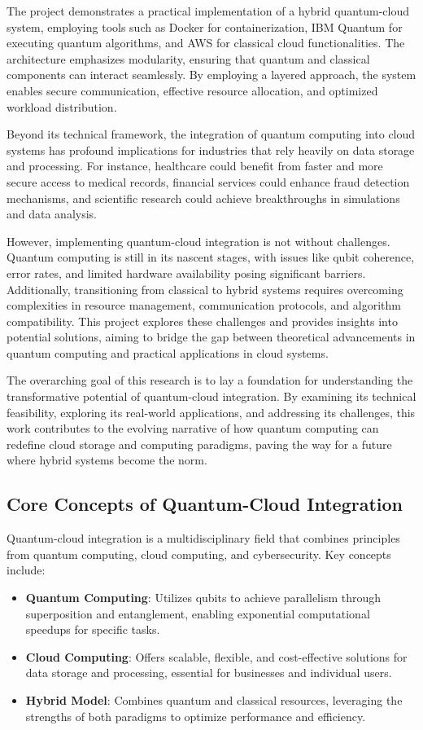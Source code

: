 \documentclass[12pt,a4paper]{article}
\begin{document}
The project demonstrates a practical implementation of a hybrid quantum-cloud system, employing tools such as Docker for containerization, IBM Quantum for executing quantum algorithms, and AWS for classical cloud functionalities. The architecture emphasizes modularity, ensuring that quantum and classical components can interact seamlessly. By employing a layered approach, the system enables secure communication, effective resource allocation, and optimized workload distribution.  

Beyond its technical framework, the integration of quantum computing into cloud systems has profound implications for industries that rely heavily on data storage and processing. For instance, healthcare could benefit from faster and more secure access to medical records, financial services could enhance fraud detection mechanisms, and scientific research could achieve breakthroughs in simulations and data analysis.  

However, implementing quantum-cloud integration is not without challenges. Quantum computing is still in its nascent stages, with issues like qubit coherence, error rates, and limited hardware availability posing significant barriers. Additionally, transitioning from classical to hybrid systems requires overcoming complexities in resource management, communication protocols, and algorithm compatibility. This project explores these challenges and provides insights into potential solutions, aiming to bridge the gap between theoretical advancements in quantum computing and practical applications in cloud systems.  

The overarching goal of this research is to lay a foundation for understanding the transformative potential of quantum-cloud integration. By examining its technical feasibility, exploring its real-world applications, and addressing its challenges, this work contributes to the evolving narrative of how quantum computing can redefine cloud storage and computing paradigms, paving the way for a future where hybrid systems become the norm.  

\subsection{Core Concepts of Quantum-Cloud Integration}
Quantum-cloud integration is a multidisciplinary field that combines principles from quantum computing, cloud computing, and cybersecurity. Key concepts include:
\begin{itemize}
    \item \textbf{Quantum Computing}: Utilizes qubits to achieve parallelism through superposition and entanglement, enabling exponential computational speedups for specific tasks.
    \item \textbf{Cloud Computing}: Offers scalable, flexible, and cost-effective solutions for data storage and processing, essential for businesses and individual users.
    \item \textbf{Hybrid Model}: Combines quantum and classical resources, leveraging the strengths of both paradigms to optimize performance and efficiency.
\end{itemize}
\end{document}
